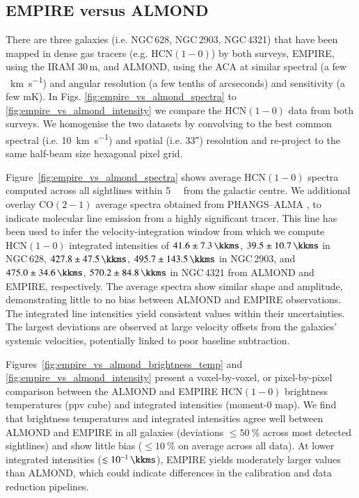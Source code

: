 \documentclass[letter, longauth]{aa} %
\newcommand*{\hcnone}{\ensuremath{\mathrm{HCN(1-0)}}\xspace} %
\newcommand*{\cotwo}{\ensuremath{\mathrm{CO(2-1)}}\xspace} %
\begin{document}
\begin{appendix}

\section{EMPIRE versus ALMOND}
\label{sec:app:empire_vs_almond}

There are three galaxies (i.e. NGC\,628, NGC\,2903, NGC\,4321) that have been mapped in dense gas tracers (e.g. \hcnone) by both surveys, EMPIRE, using the IRAM 30\,m, and ALMOND, using the ACA at similar spectral (a few \SI{}{\km\per\second}) and angular resolution (a few tenths of arcseconds) and sensitivity (a few mK).
In Figs. \ref{fig:empire_vs_almond_spectra} to \ref{fig:empire_vs_almond_intensity} we compare 
the \hcnone data from both surveys.
We homogenise the two datasets by convolving to the best common spectral (i.e. \SI{10}{\km\per\s}) and spatial (i.e. \ang{;;33}) resolution and re-project to the same half-beam size hexagonal pixel grid.

Figure~\ref{fig:empire_vs_almond_spectra} shows average \hcnone spectra computed across all sightlines within \SI{5}{\kilo\parsec} from the galactic centre.
We additional overlay \cotwo average spectra obtained from PHANGS--ALMA \citep{Leroy2021b}, to indicate molecular line emission from a highly significant tracer.
This line has been used to infer the velocity-integration window from which we compute \hcnone integrated intensities of $41.6 \pm \SI{7.3}{\kkms}$, $39.5 \pm \SI{10.7}{\kkms}$ in NGC\,628, $427.8 \pm \SI{47.5}{\kkms}$, $495.7 \pm \SI{143.5}{\kkms}$ in NGC\,2903, and $475.0 \pm \SI{34.6}{\kkms}$, $570.2 \pm \SI{84.8}{\kkms}$ in NGC\,4321 from ALMOND and EMPIRE, respectively.
The average spectra show similar shape and amplitude, demonstrating little to no bias between ALMOND and EMPIRE observations.
The integrated line intensities yield consistent values within their uncertainties.
The largest deviations are observed at large velocity offsets from the galaxies' systemic velocities, potentially linked to poor baseline subtraction.

Figures~\ref{fig:empire_vs_almond_brightness_temp} and \ref{fig:empire_vs_almond_intensity} present a voxel-by-voxel, or pixel-by-pixel comparison between the ALMOND and EMPIRE \hcnone brightness temperatures (ppv cube) and integrated intensities (moment-0 map).
We find that brightness temperatures and integrated intensities agree well between ALMOND and EMPIRE in all galaxies (deviations $\leq\SI{50}{\percent}$ across most detected sightlines) and show little bias ($\leq\SI{10}{\percent}$ on average across all data).
At lower integrated intensities ($\lesssim\SI{e-1}{\kkms}$), EMPIRE yields moderately larger values than ALMOND, which could indicate differences in the calibration and data reduction pipelines.


\end{appendix}
\end{document}

